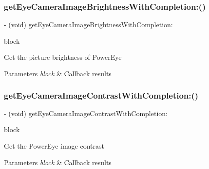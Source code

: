 \subsubsection{\texorpdfstring{get\+Eye\+Camera\+Image\+Brightness\+With\+Completion\+:()}{getEyeCameraImageBrightnessWithCompletion:()}}
{\footnotesize\ttfamily -\/ (void) get\+Eye\+Camera\+Image\+Brightness\+With\+Completion\+: \begin{DoxyParamCaption}\item[{(void($^\wedge$)(N\+S\+Integer brightness, N\+S\+Error $\ast$\+\_\+\+Nullable error))}]{block }\end{DoxyParamCaption}}

Get the picture brightness of Power\+Eye


\begin{DoxyParams}{Parameters}
{\em block} & Callback results \\
\hline
\end{DoxyParams}
\mbox{\label{interface_p_v_eye_camera_acc2edf3de4a5da9809fc72c88004d612}} 
\subsubsection{\texorpdfstring{get\+Eye\+Camera\+Image\+Contrast\+With\+Completion\+:()}{getEyeCameraImageContrastWithCompletion:()}}
{\footnotesize\ttfamily -\/ (void) get\+Eye\+Camera\+Image\+Contrast\+With\+Completion\+: \begin{DoxyParamCaption}\item[{(void($^\wedge$)(N\+S\+Integer contrast, N\+S\+Error $\ast$\+\_\+\+Nullable error))}]{block }\end{DoxyParamCaption}}

Get the Power\+Eye image contrast


\begin{DoxyParams}{Parameters}
{\em block} & Callback results \\
\hline
\end{DoxyParams}
\mbox{\label{interface_p_v_eye_camera_aa7367c91986834f4b8297224b3506bed}} 
